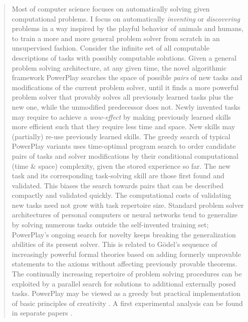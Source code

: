 \documentclass{article}
\begin{document}
\begin{abstract}
Most of computer science focuses on automatically solving given computational problems.
I focus on automatically {\em inventing} or {\em discovering} problems in a way inspired by the playful behavior of 
animals and humans,
to train a more and more general problem solver from scratch in an unsupervised fashion.
Consider the infinite set of all computable descriptions of tasks with possibly computable solutions.
Given a general problem solving architecture,
at any given time, the novel algorithmic framework {\sc PowerPlay}  \cite{Schmidhuber:11powerplay} searches 
the space of possible {\em pairs} of new tasks
and modifications of the current problem solver, 
until it finds a more powerful problem solver that provably
solves all previously learned tasks plus the new one, 
while the unmodified predecessor does not. 
Newly invented tasks may require to achieve a {\em wow-effect} by
making previously learned skills more efficient such that
they require less time and space.
New skills may (partially) re-use previously learned skills.
The greedy search of typical
 {\sc PowerPlay} variants  uses time-optimal program search to order
candidate pairs of tasks and solver modifications by their conditional computational (time \& space) complexity,
given the stored experience so far. 
The new task and its corresponding task-solving skill are those first found and validated.
This biases the search towards
pairs that can be described compactly and validated quickly.
The computational costs of validating new tasks need not grow with task repertoire size.
Standard  problem solver architectures of personal computers  or 
neural networks tend to generalize by solving numerous tasks outside the self-invented training set;
{\sc PowerPlay}'s ongoing search  for novelty keeps breaking the generalization abilities
of its present solver.
This is related  
 to G\"{o}del's sequence of increasingly powerful formal theories
based on adding formerly
unprovable statements  to the axioms without affecting previously provable theorems.
The continually increasing repertoire of problem
solving procedures can be exploited by a parallel search for solutions to additional externally posed tasks.
{\sc PowerPlay} may be viewed as a greedy but practical implementation of basic principles of creativity
\cite{Schmidhuber:06cs,Schmidhuber:10ieeetamd}.
A first experimental analysis can be found in separate papers \cite{rupesh2012icdl,powerplay2012experiments}.

\end{abstract}
\end{document}
